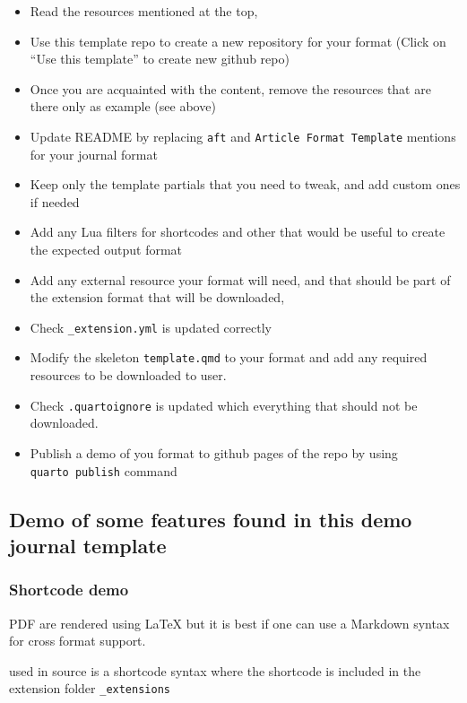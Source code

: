 \documentclass[manuscript,screen,review]{acmart}
\providecommand{\tightlist}{%
  \setlength{\itemsep}{0pt}\setlength{\parskip}{0pt}}\usepackage{longtable,booktabs,array}
\begin{document}
\begin{itemize}
\tightlist
\item
  Read the resources mentioned at the top,
\item
  Use this template repo to create a new repository for your format
  (Click on ``Use this template'' to create new github repo)
\item
  Once you are acquainted with the content, remove the resources that
  are there only as example (see above)
\item
  Update README by replacing \texttt{aft} and
  \texttt{Article\ Format\ Template} mentions for your journal format
\item
  Keep only the template partials that you need to tweak, and add custom
  ones if needed
\item
  Add any Lua filters for shortcodes and other that would be useful to
  create the expected output format
\item
  Add any external resource your format will need, and that should be
  part of the extension format that will be downloaded,
\item
  Check \texttt{\_extension.yml} is updated correctly
\item
  Modify the skeleton \texttt{template.qmd} to your format and add any
  required resources to be downloaded to user.
\item
  Check \texttt{.quartoignore} is updated which everything that should
  not be downloaded.
\item
  Publish a demo of you format to github pages of the repo by using
  \texttt{quarto\ publish} command
\end{itemize}

\subsection{Demo of some features found in this demo journal
template}\label{demo-of-some-features-found-in-this-demo-journal-template}

\subsubsection{Shortcode demo}\label{sec-shortcode}

PDF are rendered using {\LaTeX} but it is best if one can use a Markdown
syntax for cross format support.

\texttt{} used in source is a shortcode syntax where the shortcode is
included in the extension folder \texttt{\_extensions}
\end{document}
